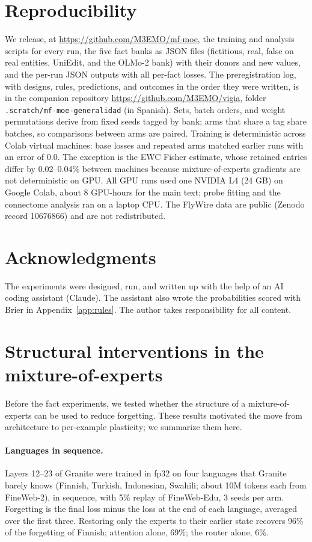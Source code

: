 \documentclass[11pt]{article}
\begin{document}
\section*{Reproducibility}
We release, at \url{https://github.com/M3EMO/mf-moe}, the training and analysis scripts for every run, the five fact banks as JSON files (fictitious, real, false on real entities, UniEdit, and the OLMo-2 bank) with their donors and new values, and the per-run JSON outputs with all per-fact losses.
The preregistration log, with designs, rules, predictions, and outcomes in the order they were written, is in the companion repository \url{https://github.com/M3EMO/vigia}, folder \texttt{.scratch/mf-moe-generalidad} (in Spanish).
Sets, batch orders, and weight permutations derive from fixed seeds tagged by bank; arms that share a tag share batches, so comparisons between arms are paired.
Training is deterministic across Colab virtual machines: base losses and repeated arms matched earlier runs with an error of 0.0. The exception is the EWC Fisher estimate, whose retained entries differ by 0.02--0.04\% between machines because mixture-of-experts gradients are not deterministic on GPU.
All GPU runs used one NVIDIA L4 (24 GB) on Google Colab, about 8 GPU-hours for the main text; probe fitting and the connectome analysis ran on a laptop CPU.
The FlyWire data are public (Zenodo record 10676866) and are not redistributed.

\section*{Acknowledgments}
The experiments were designed, run, and written up with the help of an AI coding assistant (Claude). The assistant also wrote the probabilities scored with Brier in Appendix~\ref{app:rules}. The author takes responsibility for all content.




\appendix
\section{Structural interventions in the mixture-of-experts}
\label{app:structure}
Before the fact experiments, we tested whether the structure of a mixture-of-experts can be used to reduce forgetting.
These results motivated the move from architecture to per-example plasticity; we summarize them here.

\paragraph{Languages in sequence.}
Layers 12--23 of Granite were trained in fp32 on four languages that Granite barely knows (Finnish, Turkish, Indonesian, Swahili; about 10M tokens each from FineWeb-2), in sequence, with 5\% replay of FineWeb-Edu, 3 seeds per arm.
Forgetting is the final loss minus the loss at the end of each language, averaged over the first three.
Restoring only the experts to their earlier state recovers 96\% of the forgetting of Finnish; attention alone, 69\%; the router alone, 6\%.
\end{document}
